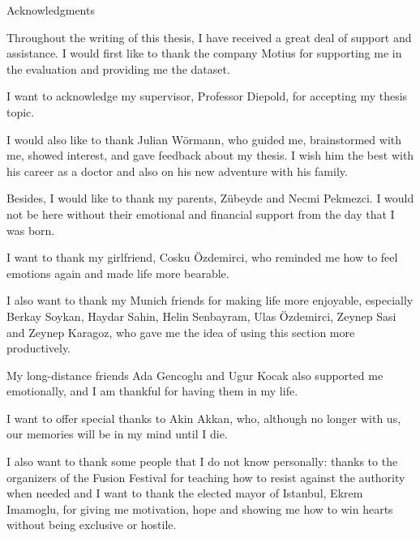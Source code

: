 \thispagestyle{empty}

\vspace*{20mm}

\begin{center}
{ Acknowledgments}
\end{center}

\vspace{10mm}

Throughout the writing of this thesis, I have received a great deal of support and assistance. I would first like to thank the company Motius for supporting me in the evaluation and providing me the dataset.

I want to acknowledge my supervisor, Professor Diepold, for accepting my thesis topic.

I would also like to thank Julian Wörmann, who guided me, brainstormed with me, showed interest, and gave feedback about my thesis. I wish him the best with his career as a doctor and also on his new adventure with his family.

Besides, I would like to thank my parents, Zübeyde and Necmi Pekmezci. I would not be here without their emotional and financial support from the day that I was born.

I want to thank my girlfriend, Cosku Özdemirci, who reminded me how to feel emotions again and made life more bearable.

I also want to thank my Munich friends for making life more enjoyable, especially Berkay Soykan, Haydar Sahin, Helin Senbayram, Ulas Özdemirci, Zeynep Sasi and Zeynep Karagoz, who gave me the idea of using this section more productively.

My long-distance friends Ada Gencoglu and Ugur Kocak also supported me emotionally, and I am thankful for having them in my life.

I want to offer special thanks to Akin Akkan, who, although no longer with us, our memories will be in my mind until I die.

I also want to thank some people that I do not know personally: thanks to the organizers of the Fusion Festival for teaching how to resist against the authority when needed and I want to thank the elected mayor of Istanbul, Ekrem Imamoglu, for giving me motivation, hope and showing me how to win hearts without being exclusive or hostile.


\cleardoublepage{}
